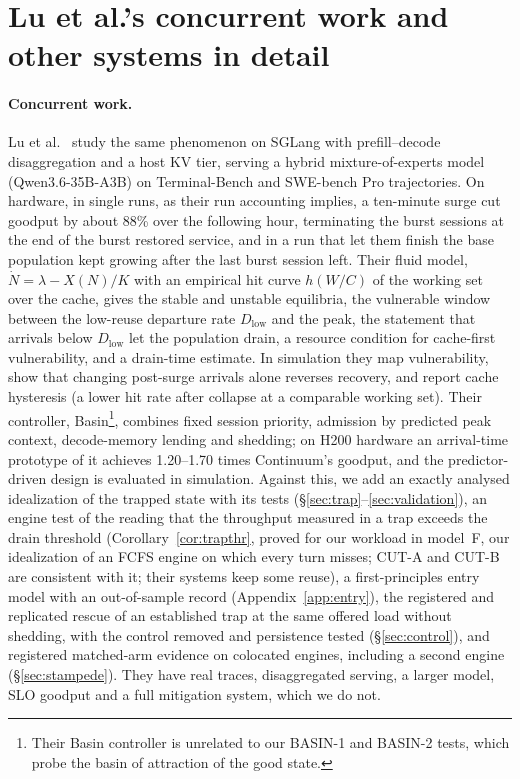 \section{Lu et al.'s concurrent work and other systems in detail}\label{app:lu}

\paragraph{Concurrent work.} Lu et al.~\citep{lu2026cachetrap} study the same phenomenon on SGLang with prefill--decode
disaggregation and a host KV tier, serving a hybrid mixture-of-experts model (Qwen3.6-35B-A3B) on Terminal-Bench and SWE-bench Pro
trajectories. On hardware, in single runs, as their run accounting implies, a ten-minute surge cut goodput by about 88\% over the following hour,
terminating the burst sessions at the end of the burst restored service, and in a run that let them finish the base population kept
growing after the last burst session left. Their fluid model, $\dot N=\lambda-X(N)/K$ with an empirical hit curve $h(W/C)$ of the
working set over the cache, gives the stable and unstable equilibria, the vulnerable window between the low-reuse departure rate
$D_{\mathrm{low}}$ and the peak, the statement that arrivals below $D_{\mathrm{low}}$ let the population drain, a resource condition
for cache-first vulnerability, and a drain-time estimate. In simulation they map vulnerability, show that changing post-surge
arrivals alone reverses recovery, and report cache hysteresis (a lower hit rate after collapse at a comparable working set). Their
controller, Basin\footnote{Their Basin controller is unrelated to our BASIN-1 and BASIN-2 tests, which probe the basin of
attraction of the good state.}, combines fixed session priority, admission by predicted peak context, decode-memory lending and
shedding; on H200 hardware an arrival-time prototype of it achieves 1.20--1.70 times Continuum's goodput, and the predictor-driven
design is evaluated in simulation. Against this, we add an exactly analysed idealization of the trapped state with its tests
(\S\ref{sec:trap}--\ref{sec:validation}), an engine test of the reading that the throughput measured in a trap exceeds the drain
threshold (Corollary~\ref{cor:trapthr}, proved for our workload in model~F, our idealization of an FCFS engine on which every turn misses;
CUT-A and
CUT-B are consistent with it; their systems keep some reuse), a first-principles entry model with an
out-of-sample record (Appendix~\ref{app:entry}), the registered and replicated rescue of an established trap at the same offered
load without shedding, with the control removed and persistence tested (\S\ref{sec:control}), and registered matched-arm evidence on colocated engines,
including a second engine (\S\ref{sec:stampede}). They have real traces, disaggregated serving, a larger model, SLO goodput and a full
mitigation system, which we do not.

